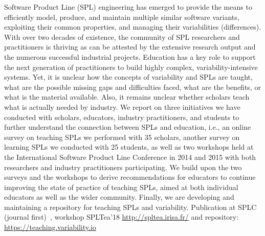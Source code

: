 Software Product Line (SPL) engineering has emerged to provide the means to efficiently model, produce, and maintain multiple similar software variants, exploiting their common properties, and managing their variabilities (differences). With over two decades of existence, the community of SPL researchers and practitioners is thriving as can be attested by the extensive research output and the numerous successful industrial projects. Education has a key role to support the next generation of practitioners to build highly complex, variability-intensive systems. Yet, it is unclear how the concepts of variability and SPLs are taught, what are the possible missing gaps and difficulties faced, what are the benefits, or what is the material available. Also, it remains unclear whether scholars teach what is actually needed by industry. We report on three initiatives we have conducted with scholars, educators, industry practitioners, and students to further understand the connection between SPLs and education, i.e., an online survey on teaching SPLs we performed with 35 scholars, another survey on learning SPLs we conducted with 25 students, as well as two workshops held at the International Software Product Line Conference in 2014 and 2015 with both researchers and industry practitioners participating. We build upon the two surveys and the workshops to derive recommendations for educators to continue improving the state of practice of teaching SPLs, aimed at both individual educators as well as the wider community. Finally, we are developing and maintaining a repository for teaching SPLs and variability.
Publication at SPLC (journal first)~\cite{acher:hal-01829933}, workshop SPLTea'18 \url{http://spltea.irisa.fr/} and repository: \url{https://teaching.variability.io}


